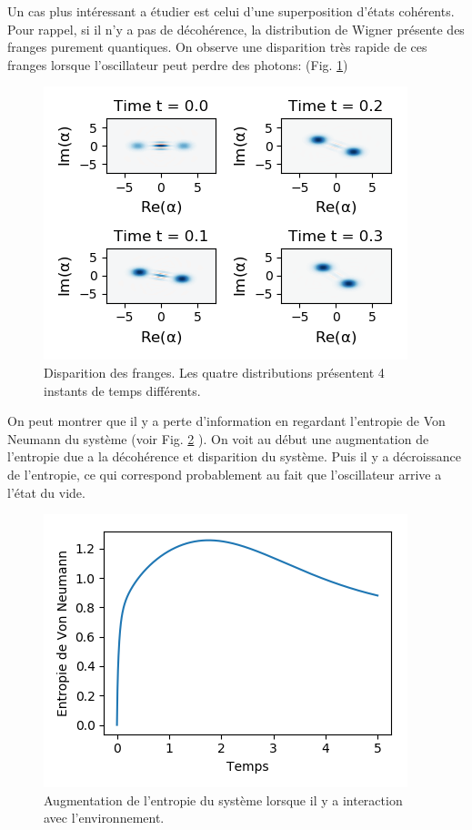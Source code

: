 \documentclass[11pt,a4paper]{article}
\begin{document}
	Un cas plus intéressant a étudier est celui d'une superposition d'états cohérents.  Pour rappel, si il n'y a pas de décohérence, la distribution de Wigner présente des franges purement quantiques. On observe une disparition très rapide de ces franges lorsque l'oscillateur peut perdre des photons: (Fig. \ref{fig:Coh_sum_deco})
	\begin{figure}
		\centering
		\includegraphics[width=0.7\linewidth]{Coh_sum_deco}
		\caption{Disparition des franges. Les quatre distributions présentent 4 instants de temps différents.}
		\label{fig:Coh_sum_deco}
	\end{figure}

	On peut montrer que il y a perte d'information en regardant l'entropie de Von Neumann du système (voir Fig.	\ref{fig:Entropy} ). On voit au début une  augmentation  de l'entropie due a la décohérence et disparition du système. Puis il y a décroissance de l'entropie, ce qui correspond probablement au fait que l'oscillateur arrive a l'état du vide.
	

	\begin{figure}
		\centering
		\includegraphics[width=0.7\linewidth]{Entropy}
		\caption{Augmentation de l'entropie du système lorsque il y a interaction avec l'environnement.}
		\label{fig:Entropy}
	\end{figure}
	
\end{document}
